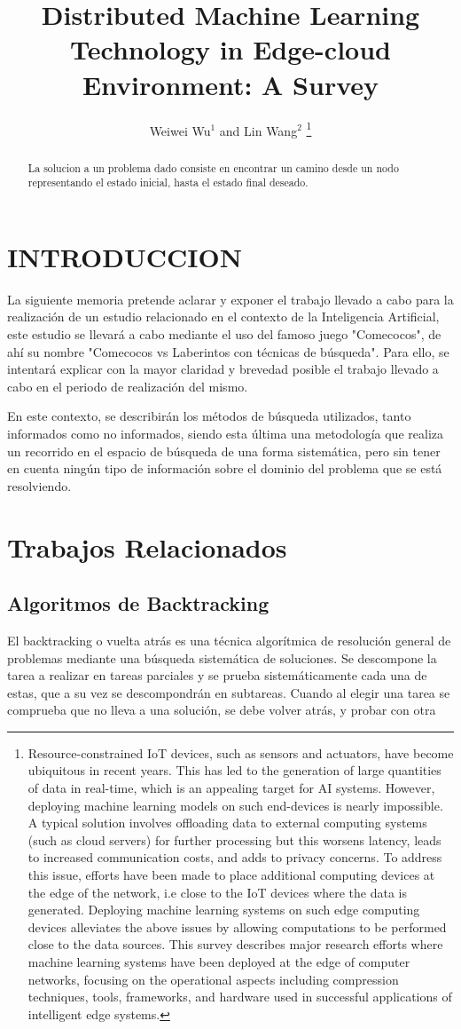 \documentclass[letterpaper, 10 pt, conference]{ieeeconf}  %
\title{\LARGE \bf
Distributed Machine Learning Technology in Edge-cloud Environment: A Survey
}
\author{Weiwei Wu$^{1}$ and Lin Wang$^{2}$%
\thanks{Resource-constrained IoT devices, such as sensors and actuators, have become ubiquitous in recent years. This has led to the generation of large quantities of data in real-time, which is an appealing target for AI systems. However, deploying machine learning models on such end-devices is nearly impossible. A typical solution involves offloading data to external computing systems (such as cloud servers) for further processing but this worsens latency, leads to increased communication costs, and adds to privacy concerns. To address this issue, efforts have been made to place additional computing devices at the edge of the network, i.e close to the IoT devices where the data is generated. Deploying machine learning systems on such edge computing devices alleviates the above issues by allowing computations to be performed close to the data sources. This survey describes major research efforts where machine learning systems have been deployed at the edge of computer networks, focusing on the operational aspects including compression techniques, tools, frameworks, and hardware used in successful applications of intelligent edge systems.}%
}
\begin{document}
\maketitle
\thispagestyle{empty}
\pagestyle{empty}


\begin{abstract}

La solucion a un problema dado consiste en encontrar un camino desde un nodo representando el estado inicial, hasta el estado final deseado.
\end{abstract}


\section{INTRODUCCION}

La siguiente memoria pretende aclarar y exponer el trabajo llevado a cabo para la realización de un estudio relacionado en el contexto de la Inteligencia Artificial, este estudio se llevará a cabo mediante el uso del famoso juego "Comecocos", de ahí su nombre  "Comecocos vs Laberintos con técnicas de búsqueda". Para ello, se intentará explicar con la mayor claridad y brevedad posible el trabajo llevado a cabo en el periodo de realización del mismo.

En este contexto, se describirán los métodos de búsqueda utilizados, tanto informados como no informados, siendo esta última una  metodología que realiza un recorrido en el espacio de búsqueda de una forma sistemática, pero sin tener en cuenta ningún tipo de información sobre el dominio del problema que se está resolviendo.

\section{Trabajos Relacionados}

\subsection{Algoritmos de Backtracking}

El backtracking o vuelta atrás es una técnica algorítmica de resolución general de problemas mediante una búsqueda sistemática de soluciones.
Se descompone la tarea a realizar en tareas parciales y se prueba sistemáticamente cada una de estas, que a su vez se descompondrán en subtareas.
Cuando al elegir una tarea se comprueba que no lleva a una solución, se debe volver atrás, y probar con otra
\end{document}
